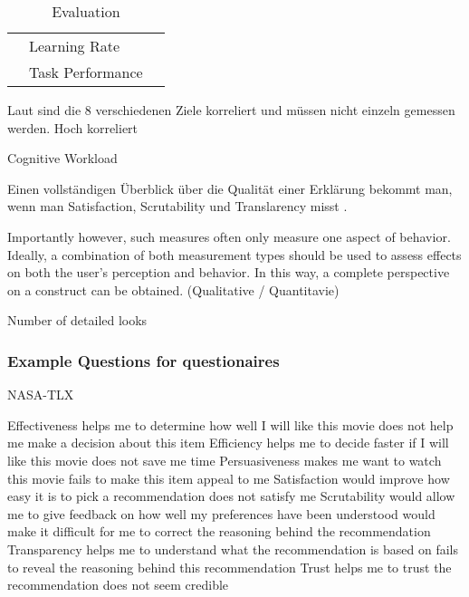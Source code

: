 \begin{table}[htb!]
\begin{center}
\begin{tabular}{|p{}|p{}|p{}|}
                        & Learning Rate                     & \cite{tintarev_designing_nodate} \cite{gunning2019darpa} \\
                        & Task Performance                  & \cite{waa_evaluating_2021}  \cite{mucha_interfaces_2021}  
                                                            \cite{abdulrahman_belief-based_2019} 
                                                            \cite{zolotas_towards_2019} \cite{martin_developing_2019} 
                                                            \cite{martin_evaluating_2021} \cite{gunning2019darpa} \\
            \hline
        \end{tabular}
    \end{center}
    \caption{Evaluation}
    \label{tab:evaluation_of_explanations}
\end{table}


Laut \cite{balog_measuring_2020} sind die 8 verschiedenen Ziele korreliert und müssen nicht einzeln gemessen werden. Hoch korreliert \cite{kouki_user_2017}

Cognitive Workload 

Einen vollständigen Überblick über die Qualität einer Erklärung bekommt man, wenn man Satisfaction, Scrutability und Translarency misst \cite{balog_measuring_2020}.

\glqq Importantly however, such measures often only measure one aspect of behavior. Ideally, a combination of both measurement types should be used to assess effects on both the user’s perception and behavior. In this way, a complete perspective on a construct can be obtained.\grqq{} (Qualitative / Quantitavie) \cite{waa_evaluating_2021}

Number of detailed looks

\subsubsection{Example Questions for questionaires}

NASA-TLX \cite{tsai_evaluating_2019}

Effectiveness helps me to determine how well I will like this movie does not help me make a decision about this item Efficiency helps me to decide faster if I will like this movie does not save me time Persuasiveness makes me want to watch this movie fails to make this item appeal to me Satisfaction would improve how easy it is to pick a recommendation does not satisfy me Scrutability would allow me to give feedback on how well my preferences have been understood would make it difficult for me to correct the reasoning behind the recommendation Transparency helps me to understand what the recommendation is based on fails to reveal the reasoning behind this recommendation Trust helps me to trust the recommendation does not seem credible \cite{balog_measuring_2020}

